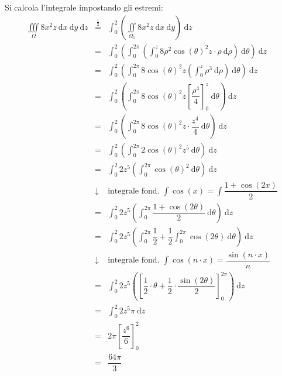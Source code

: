 \documentclass[a4paper]{article}
\begin{document}
	\noindent
	Si calcola l'integrale impostando gli estremi:
	\begin{equation*}
		\begin{array}{rcl}
			\displaystyle\iiint\limits_{\Omega} 8x^{2}z \:\mathrm{d}x\:\mathrm{d}y\:\mathrm{d}z 
			&\overset{\frac{1}{2}}{=}& 
			\displaystyle\int_{0}^{2} \left(\iint\limits_{\Omega_{1}}8x^{2}z \:\mathrm{d}x\:\mathrm{d}y\right) \:\mathrm{d}z \\ [1.5em]
			&=&
			\displaystyle\int_{0}^{2} \left(\int_{0}^{2\pi} \left(\int_{0}^{z} 8 \rho^{2}\cos\left(\theta\right)^{2}z \cdot \rho \:\mathrm{d}\rho\right) \:\mathrm{d}\theta\right) \:\mathrm{d}z \\ [1.5em]
			&=&
			\displaystyle\int_{0}^{2} \left(\int_{0}^{2\pi} 8\cos\left(\theta\right)^{2}z\left(\int_{0}^{z} \rho^{3} \:\mathrm{d}\rho\right) \:\mathrm{d}\theta\right) \:\mathrm{d}z \\ [1.5em]
			&=&
			\displaystyle\int_{0}^{2} \left(\int_{0}^{2\pi} 8\cos\left(\theta\right)^{2}z\left[\dfrac{\rho^{4}}{4}\right]_{0}^{z} \:\mathrm{d}\theta\right) \:\mathrm{d}z \\ [1.5em]
			&=&
			\displaystyle\int_{0}^{2} \left(\int_{0}^{2\pi} 8\cos\left(\theta\right)^{2}z\cdot\dfrac{z^{4}}{4} \:\mathrm{d}\theta\right) \:\mathrm{d}z \\ [1.5em]
			&=&
			\displaystyle\int_{0}^{2} \left(\int_{0}^{2\pi} 2\cos\left(\theta\right)^{2}z^{5} \:\mathrm{d}\theta\right) \:\mathrm{d}z \\ [1.5em]
			&=&
			\displaystyle\int_{0}^{2} 2z^{5}\left(\int_{0}^{2\pi} \cos\left(\theta\right)^{2} \:\mathrm{d}\theta\right) \:\mathrm{d}z \\ [1.5em]
			&\downarrow& \text{integrale fond. } \displaystyle\int\cos\left(x\right) = \int\dfrac{1+\cos\left(2x\right)}{2} \\ [1.5em]
			&=&
			\displaystyle\int_{0}^{2} 2z^{5}\left(\int_{0}^{2\pi} \dfrac{1+\cos\left(2\theta\right)}{2} \:\mathrm{d}\theta\right) \:\mathrm{d}z \\ [1.5em]
			&=&
			\displaystyle\int_{0}^{2} 2z^{5}\left(\int_{0}^{2\pi} \dfrac{1}{2} + \dfrac{1}{2}\int_{0}^{2\pi} \cos\left(2\theta\right) \:\mathrm{d}\theta\right) \:\mathrm{d}z \\ [1.5em]
			&\downarrow& \text{integrale fond. } \displaystyle\int\cos\left(n \cdot x\right) = \dfrac{\sin\left(n \cdot x\right)}{n} \\ [1.5em]
			&=&
			\displaystyle\int_{0}^{2} 2z^{5}\left(\left[\dfrac{1}{2} \cdot \theta + \dfrac{1}{2} \cdot \dfrac{\sin\left(2\theta\right)}{2}\right]_{0}^{2\pi} \right) \:\mathrm{d}z \\ [1.5em]
			&=&
			\displaystyle\int_{0}^{2} 2z^{5} \pi \:\mathrm{d}z \\ [1.5em]
			&=&
			2\pi \left[\dfrac{z^{6}}{6}\right]_{0}^{2} \\ [1.5em]
			&=&
			\dfrac{64 \pi}{3}
		\end{array}
	\end{equation*}
\end{document}
